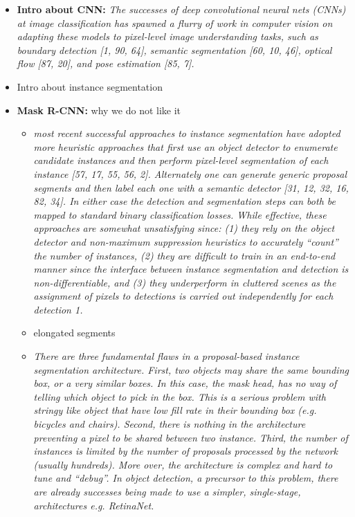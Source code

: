 \documentclass[10pt,twocolumn,letterpaper]{article}
\newcommand\SOURCE[1]{{\color{green}{(from: #1)}}}
\begin{document}
\begin{itemize}
\item \textbf{Intro about CNN:} \textit{The successes of deep convolutional neural nets (CNNs) at image classiﬁcation has spawned a ﬂurry of work in computer vision on adapting these models to pixel-level image understanding tasks, such as boundary detection [1, 90, 64], semantic segmentation [60, 10, 46], optical ﬂow [87, 20], and pose estimation [85, 7].} \SOURCE{Rec. embeddings}
\item Intro about instance segmentation
\item \textbf{Mask R-CNN:} why we do not like it 
\begin{itemize}
\item \textit{most recent successful approaches to instance segmentation have adopted more heuristic approaches that first use an object detector to enumerate candidate instances and then perform pixel-level segmentation of each instance [57, 17, 55, 56, 2]. Alternately one can generate generic proposal segments and then label each one with a semantic detector [31, 12, 32, 16, 82, 34]. In either case the detection and segmentation steps can both be mapped to standard binary classiﬁcation losses. While effective, these approaches are somewhat unsatisfying since: (1) they rely on the object detector and non-maximum suppression heuristics to accurately “count” the number of instances, (2) they are difﬁcult to train in an end-to-end manner since the interface between instance segmentation and detection is non-differentiable, and (3) they underperform in cluttered scenes as the assignment of pixels to detections is carried out independently for each detection 1.} \SOURCE{Rec. embeddings}
\item elongated segments
\item \textit{There are three fundamental flaws in a proposal-based instance segmentation architecture. First, two objects may share the same bounding box, or a very similar boxes. In this case, the mask head, has no way of telling which object to pick in the box. This is a serious problem with stringy like object that have low fill rate in their bounding box (e.g. bicycles and chairs). Second, there is nothing in the architecture preventing a pixel to be shared between two instance. Third, the number of instances is limited by the number of proposals processed by the network (usually hundreds). More over, the architecture is complex and hard to tune and “debug”. In object detection, a precursor to this problem, there are already successes being made to use a simpler, single-stage, architectures e.g. RetinaNet.}
\end{itemize}


\end{itemize}
\end{document}
